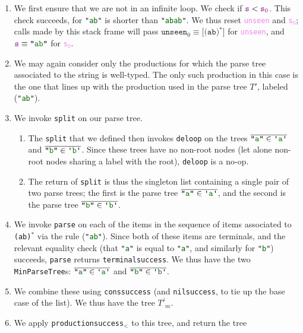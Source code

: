 \documentclass[preprint]{sigplanconf}
\newcommand{\str}[1]{\texttt{"\textcolor{DarkGreen}{#1}"}}
\newcommand{\regex}[1]{\texttt{#1}}
\newcommand{\terminal}[1]{\texttt{\textquotesingle\textcolor{DarkGreen}{#1}\textquotesingle}}
\newcommand{\fname}[1]{\texttt{#1}}
\newcommand{\farg}[1]{\textcolor{violet}{\texttt{#1}}}
\newcommand{\indname}[1]{\texttt{#1}}
\newcommand{\valuelist}[1]{\texttt{[}#1\texttt{]}}
\def\_{\textunderscore}
\begin{document}
\begin{enumerate}
        \begin{enumerate}
          \item
            We first ensure that we are not in an infinite loop.  We check if $\farg{s} < \farg{s$_0$}$.  This check succeeds, for \str{ab} is shorter than \str{abab}.  We thus reset \farg{unseen} and \farg{s$_0$}; calls made by this stack frame will pass $\fname{unseen$_0$}\equiv \valuelist{\regex{(ab)$^*$}}$ for \farg{unseen}, and $\farg{s} \equiv \str{ab}$ for \farg{s$_0$}.
          \item
            We may again consider only the productions for which the parse tree associated to the string is well-typed.  The only such production in this case is the one that lines up with the production used in the parse tree $T'$, labeled (\str{ab}).
          \item
            We invoke \fname{split} on our parse tree.
            \begin{enumerate}
              \item
                The \fname{split} that we defined then invokes \fname{deloop} on the trees $\overline{\str{a}\in \terminal{a}}$ and $\overline{\str{b}\in \terminal{b}}$.  Since these trees have no non-root nodes (let alone non-root nodes sharing a label with the root), \fname{deloop} is a no-op.
              \item
                The return of \fname{split} is thus the singleton list containing a single pair of two parse trees; the first is the parse tree $\overline{\str{a}\in \terminal{a}}$, and the second is the parse tree $\overline{\str{b}\in \terminal{b}}$.
            \end{enumerate}
          \item
            We invoke \fname{parse} on each of the items in the sequence of items associated to \regex{(ab)$^*$} via the rule (\str{ab}).  Since both of these items are terminals, and the relevant equality check (that \str{a} is equal to \str{a}, and similarly for \str{b}) succeeds, \fname{parse} returns \fname{terminal\_success}.  We thus have the two \indname{MinParseTree}s: $\overline{\str{a}\in \terminal{a}}$ and $\overline{\str{b}\in \terminal{b}}$.
          \item
            We combine these using \fname{cons\_success} (and \fname{nil\_success}, to tie up the base case of the list).  We thus have the tree $\overline{T'_m}$.
          \item
            We apply \fname{production\_success$_<$} to this tree, and return the tree

\end{enumerate}
\end{enumerate}
\end{document}

